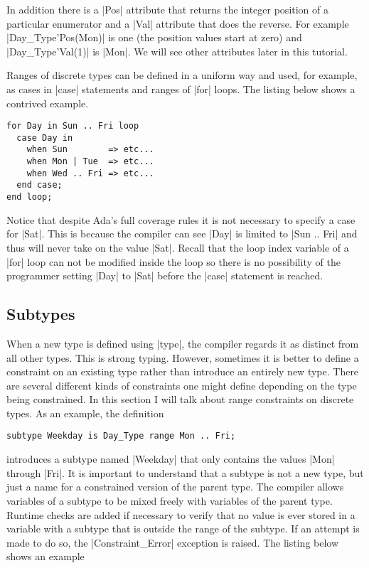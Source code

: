 In addition there is a |Pos| attribute that returns the integer position of a particular
enumerator and a |Val| attribute that does the reverse. For example |Day_Type'Pos(Mon)| is one
(the position values start at zero) and |Day_Type'Val(1)| is |Mon|. We will see other attributes
later in this tutorial.

Ranges of discrete types can be defined in a uniform way and used, for example, as cases in
|case| statements and ranges of |for| loops. The listing below shows a contrived example.

\begin{lstlisting}
for Day in Sun .. Fri loop
  case Day in
    when Sun        => etc...
    when Mon | Tue  => etc...
    when Wed .. Fri => etc...
  end case;
end loop;
\end{lstlisting}

\noindent Notice that despite Ada's full coverage rules it is not necessary to specify a case
for |Sat|. This is because the compiler can see |Day| is limited to |Sun .. Fri| and thus will
never take on the value |Sat|. Recall that the loop index variable of a |for| loop can not be
modified inside the loop so there is no possibility of the programmer setting |Day| to |Sat|
before the |case| statement is reached.

\subsection{Subtypes}

When a new type is defined using |type|, the compiler regards it as distinct from all other
types. This is strong typing. However, sometimes it is better to define a constraint on an
existing type rather than introduce an entirely new type. There are several different kinds of
constraints one might define depending on the type being constrained. In this section I will
talk about range constraints on discrete types. As an example, the definition

\begin{lstlisting}
subtype Weekday is Day_Type range Mon .. Fri;
\end{lstlisting}

\noindent introduces a subtype named |Weekday| that only contains the values |Mon| through
|Fri|. It is important to understand that a subtype is not a new type, but just a name for a
constrained version of the parent type. The compiler allows variables of a subtype to be mixed
freely with variables of the parent type. Runtime checks are added if necessary to verify that
no value is ever stored in a variable with a subtype that is outside the range of the subtype.
If an attempt is made to do so, the |Constraint_Error| exception is raised. The listing below
shows an example

